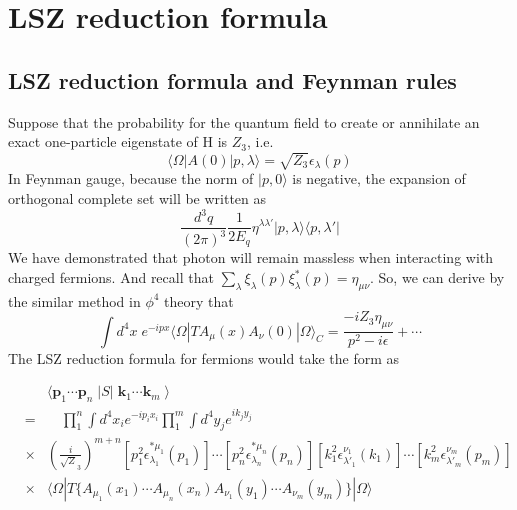 \documentclass[cyan]{elegantnote}
\begin{document}
\section{LSZ reduction formula}
\subsection{LSZ reduction formula and Feynman rules}
\noindent
Suppose that the probability for the quantum field to create or annihilate an exact one-particle eigenstate of H is $Z_3$, i.e.
\[\langle \Omega | A(0) | p,\lambda \rangle = \sqrt{Z_3} \epsilon_{\lambda}(p)\]
In Feynman gauge, because the norm of $|p,0\rangle$ is negative, the expansion of orthogonal complete set will be written as
\[\frac{d^3q}{(2\pi)^3} \frac{1}{2E_q} \eta^{\lambda\lambda'} | p,\lambda\rangle\langle p, \lambda' |\]
We have demonstrated that photon will remain massless when interacting with charged fermions. And recall that $\sum_{\lambda}\xi_{\lambda}(p)\xi^{*}_{\lambda}(p) = \eta_{\mu\nu}$. So, we can derive by the similar method in $\phi^4$ theory that
\[\int d^4x \; e^{-ipx} \langle \Omega | T A_{\mu}(x) A_{\nu}(0) | \Omega \rangle_C = \frac{-iZ_3\eta_{\mu\nu}}{p^2-i\epsilon} + \cdots \]
The LSZ reduction formula for fermions would take the form as
\\

\begin{newthem}
\begin{eqnarray}
&\phantom{=}& \langle \bm{p}_1 \cdots \bm{p}_n \; | S | \; \bm{k}_1 \cdots \bm{k}_m \; \rangle  
\nonumber \\
&=& \quad \prod_1^n \int d^4 x_i e^{-i p_ix_i } \prod_1^m \int d^4 y_j e^{ik_jy_j} 
\nonumber \\
&\times & \left( \frac{i}{\sqrt{Z}_3} \right) ^{m+n}  [p_1^2 \epsilon^{*\mu_1}_{\lambda_1}(p_1)] \cdots [p_n^2 \epsilon^{*\mu_n}_{\lambda_n}(p_n)] [k_1^2 \epsilon^{ \nu_1}_{\lambda'_1}(k_1)] \cdots [k_m^2 \epsilon^{ \nu_m}_{\lambda'_m}(p_m)]
\nonumber \\
&\times & \langle \Omega | T \{A_{\mu_1}(x_1) \cdots A_{\mu_n}(x_n)
A_{\nu_1}(y_1) \cdots A_{\nu_m}(y_m) \} | \Omega \rangle
\nonumber
\end{eqnarray}
\end{newthem}
\end{document}
